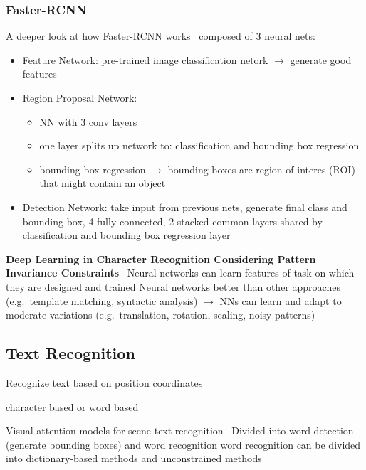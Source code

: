 \subsubsection*{Faster-RCNN}
A deeper look at how Faster-RCNN works~\citep{goswami_deeper_2018}
composed of 3 neural nets:
\begin{itemize}
    \item Feature Network: pre-trained image classification netork $\rightarrow$ generate good features
    \item Region Proposal Network:
        \begin{itemize}
            \item NN with 3 conv layers
            \item one layer splits up network to: classification and bounding box regression
            \item bounding box regression $\rightarrow$ bounding boxes are region of interes (ROI)
                that might contain an object
        \end{itemize}
    \item Detection Network: take input from previous nets, generate final class and bounding box,
        4 fully connected, 2 stacked common layers shared by classification and bounding box regression
        layer \end{itemize}

\textbf{Deep Learning in Character Recognition Considering Pattern Invariance
Constraints}~\citep{oyedotun_deep_2015}
Neural networks can learn features of task on which they are designed and trained
Neural networks better than other approaches (e.g.\ template matching, syntactic analysis)
$\rightarrow$ NNs can learn and adapt to moderate variations (e.g.\ translation, rotation, scaling,
noisy patterns)

\subsection*{Text Recognition}
Recognize text based on position coordinates

character based or word based

Visual attention models for scene text recognition~\citep{ghosh_visual_2017}
Divided into word detection (generate bounding boxes) and word recognition
word recognition can be divided into dictionary-based methods and unconstrained methods
